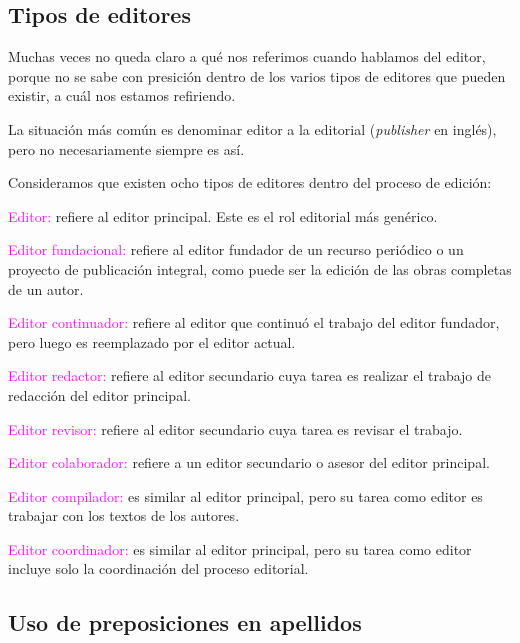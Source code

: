 \documentclass{book}
\begin{document}
{{{{{{{{\subsection{Tipos de editores}
\label{tipos-de-editores}

Muchas veces no queda claro a qué nos referimos cuando hablamos del editor, porque no se sabe con presición dentro de los varios tipos de editores que pueden existir, a cuál nos estamos refiriendo.

La situación más común es denominar editor a la editorial (\emph{publisher} en inglés), pero no necesariamente siempre es así.

Consideramos que existen ocho tipos de editores dentro del proceso de edición:

\begin{compactdesc}
\item [\textcolor{magenta}{Editor:}] refiere al editor principal. Este es el rol editorial más genérico.
\item [\textcolor{magenta}{Editor fundacional:}] refiere al editor fundador de un recurso periódico o un proyecto de publicación integral, como puede ser la edición de las obras completas de un autor.
\item [\textcolor{magenta}{Editor continuador:}] refiere al editor que continuó el trabajo del editor fundador, pero luego es reemplazado por el editor actual.
\item [\textcolor{magenta}{Editor redactor:}] refiere al editor secundario cuya tarea es realizar el trabajo de redacción del editor principal.
\item [\textcolor{magenta}{Editor revisor:}] refiere al editor secundario  cuya tarea es revisar el trabajo.
\item [\textcolor{magenta}{Editor colaborador:}] refiere a un editor secundario o asesor del editor principal.
\item [\textcolor{magenta}{Editor compilador:}] es similar al editor principal, pero su tarea como editor es trabajar con los textos de los autores.
\item [\textcolor{magenta}{Editor coordinador:}] es similar al editor principal, pero su tarea como editor incluye solo la coordinación del proceso editorial.
\end{compactdesc}

\subsection[Uso de preposiciones en apellidos]{Uso de preposiciones en apellidos \parencite{Fundeu2018}}

}}}}}}}}
\end{document}
